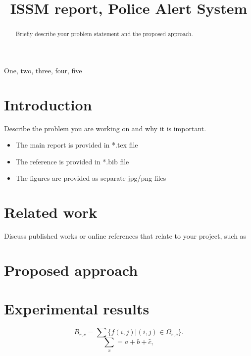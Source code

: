 \documentclass{article}
\title{ISSM report, Police Alert System}
\begin{document}
%
\maketitle
%
\begin{abstract}

Briefly describe your problem statement and the proposed approach.

\end{abstract}
%
\begin{keywords}
One, two, three, four, five
\end{keywords}
%
\section{Introduction}
\label{sec:intro}

Describe the problem you are working on and why it is important.

\begin{itemize}
  \item The main report is provided in *.tex file
  \item The reference is provided in *.bib file
  \item The figures are provided as separate jpg/png files
\end{itemize}


\section{Related work}

Discuss published works or online references that relate to your project, such as \cite{adams1995hitchhiker}

\section{Proposed approach}
\label{sec:proposed approach}


\section{Experimental results}
\label{sec:experimental results}

\begin{equation}\label{equation block model}
B_{r,c}=\sum\{f(i,j)|(i,j)\in \Omega_{r,c}\}.
\end{equation}
\begin{equation}\label{equation 1}
\sum_{x}=a+b+\hat{c},
\end{equation}
\end{document}
